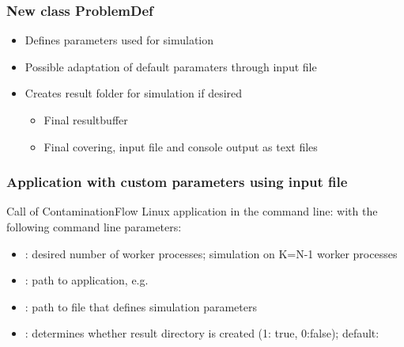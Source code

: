 \subsubsection{New class ProblemDef}
\begin{itemize}[noitemsep,topsep=0pt, partopsep=0pt]
\item Defines parameters used for simulation
\item Possible adaptation of default paramaters through input file
\item Creates result folder for simulation if desired
	\begin{itemize}[noitemsep,topsep=0pt, partopsep=0pt]
	\item Final resultbuffer
	\item Final covering, input file and console output as text files
	\end{itemize}
\end{itemize}

\subsubsection{Application with custom parameters using input file}
Call of ContaminationFlow Linux application in the command line:
\smallskip
with the following command line parameters:
\begin{itemize}[noitemsep,topsep=0pt, partopsep=0pt]
\item {}: desired number of worker processes; simulation on K=N-1 worker processes
\item {}: path to application, e.g.\ 
\item {}: path to file that defines simulation parameters
\item {}: determines whether result directory is created (1: true, 0:false); default:
\end{itemize}
\smallskip

